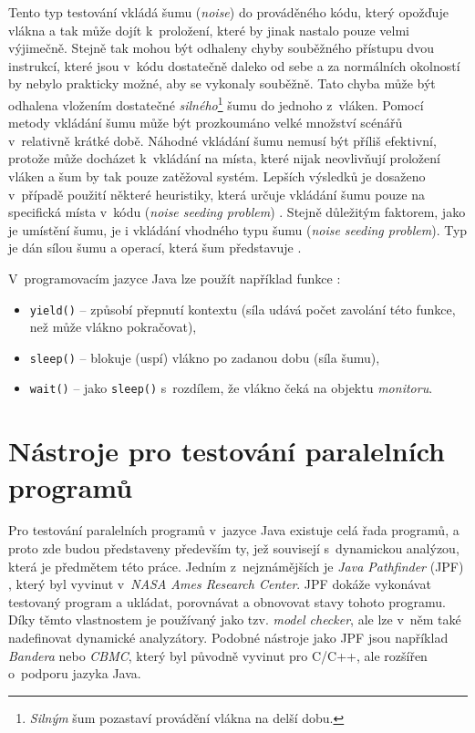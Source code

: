 Tento typ testování vkládá šumu (\textit{noise}) \cite{cite:sum} do prováděného kódu, který opožďuje vlákna a tak může dojít k~proložení, které by jinak nastalo pouze velmi výjimečně. Stejně tak mohou být odhaleny chyby souběžného přístupu dvou instrukcí, které jsou v~kódu dostatečně daleko od sebe a za normálních okolností by nebylo prakticky možné, aby se vykonaly souběžně. Tato chyba může být odhalena vložením dostatečné \textit{silného}\footnote{\textit{Silným} šum pozastaví provádění vlákna na delší dobu.} šumu do jednoho z~vláken. Pomocí metody vkládání šumu může být prozkoumáno velké množství scénářů v~relativně krátké době. Náhodné vkládání šumu nemusí být příliš efektivní, protože může docházet k~vkládání na místa, které nijak neovlivňují proložení vláken a šum by tak pouze zatěžoval systém. Lepších výsledků je dosaženo v~případě použití některé heuristiky, která určuje vkládání šumu pouze na specifická místa v~kódu (\textit{noise seeding problem}) \cite{cite:advances}. Stejně důležitým faktorem, jako je umístění šumu, je i vkládání vhodného typu šumu (\textit{noise seeding problem}). Typ je dán sílou šumu a operací, která šum představuje \cite{cite:advances}.

V~programovacím jazyce Java lze použít například funkce \cite{cite:javad}:
\begin{itemize}
\item \texttt{yield()} -- způsobí přepnutí kontextu (síla udává počet zavolání této funkce, než může vlákno pokračovat),
\item \texttt{sleep()} -- blokuje (uspí) vlákno po zadanou dobu (síla šumu),
\item \texttt{wait()} -- jako \texttt{sleep()} s~rozdílem, že vlákno čeká na objektu \textit{monitoru}.
\end{itemize}


\chapter{Nástroje pro testování paralelních programů}

Pro testování paralelních programů v~jazyce Java existuje celá řada programů, a proto zde budou představeny především ty, jež souvisejí s~dynamickou analýzou, která je předmětem této práce. Jedním z~nejznámějších je \textit{Java Pathfinder} (JPF) \cite{cite:jpf}, který byl vyvinut v~\textit{NASA Ames Research Center}. JPF dokáže vykonávat testovaný program a ukládat, porovnávat a obnovovat stavy tohoto programu. Díky těmto vlastnostem je používaný jako tzv. \textit{model checker}, ale lze v~něm také nadefinovat dynamické analyzátory. Podobné nástroje jako JPF jsou například \textit{Bandera} nebo \textit{CBMC}, který byl původně vyvinut pro C/C++, ale rozšířen o~podporu jazyka Java.

